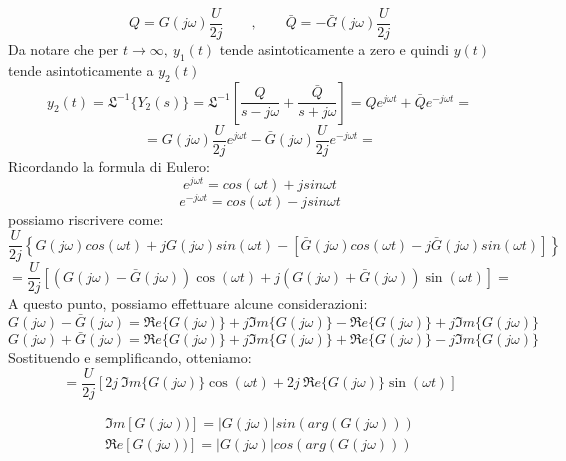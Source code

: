 \documentclass[a4paper]{report}
\begin{document}
\begin{displaymath}
  Q = G(j\omega)\dfrac{U}{2j}\qquad,\qquad
\bar{Q} = -\bar{G}(j\omega)\dfrac{U}{2j}
\end{displaymath}
Da notare che per $t \to \infty, ~y_1(t)$ tende asintoticamente a zero
e quindi $y(t)$ tende asintoticamente a $y_2(t)$
\begin{displaymath}
  y_2(t)=\mathfrak{L}^{-1}\{Y_2(s)\} = \mathfrak{L}^{-1} \left[ \dfrac{Q}{s
      - j\omega} + \dfrac{\bar{Q}}{s + j\omega} \right] = Q e^{j\omega
    t}+\bar Q e^{-j\omega t}=
\end{displaymath}
\begin{displaymath}
  = G(j\omega)\dfrac{U}{2j} e^{j\omega t} - \bar
  G(j\omega)\dfrac{U}{2j} e^{-j\omega t} =
\end{displaymath}
Ricordando la formula di Eulero\label{formulaDiEulero}:
\[
  e^{j \omega t} = cos(\omega t) + j sin{\omega t}
\]
\[
  e^{-j \omega t} = cos(\omega t) - j sin{\omega t}
\]
possiamo riscrivere come:
\[
  \dfrac{U}{2j} \left\{G(j \omega) cos(\omega t) + j G(j \omega)
  sin(\omega t) - [\bar{G}(j \omega) cos(\omega t) - j\bar{G}(j
    \omega)sin(\omega t)] \right\}
\]
\begin{displaymath}
  =\dfrac{U}{2j}\left[\left(G(j\omega)-\bar G(j\omega)\right)\cos (\omega
    t) + j\left(G(j\omega)+\bar G(j\omega)\right)\sin (\omega t)\right]=
\end{displaymath}
A questo punto, possiamo effettuare alcune considerazioni:
\[
  G(j \omega) - \bar{G}(j \omega) = \Re e\{G(j \omega)\} + j \Im m\{G(j \omega)\} -
  \Re e\{G(j \omega)\} + j \Im m\{G(j \omega)\}
\]
\[
  G(j \omega) + \bar{G}(j \omega) = \Re e\{G(j \omega)\} + j \Im m\{G(j \omega)\} +
  \Re e\{G(j \omega)\} - j \Im m\{G(j \omega)\}
\]
Sostituendo e semplificando, otteniamo:
\begin{displaymath}
  =\dfrac{U}{2j}[2j~\Im m\{ G(j\omega)\}\cos (\omega t) + 2j~\Re e
    \{G(j\omega)\}\sin(\omega t)]
\end{displaymath}

\begin{equation*}
  \begin{array}{l}
    \Im m[G(j\omega))] = |G(j\omega)| sin(arg(G(j\omega)))\\
    \Re e[G(j\omega))] = |G(j\omega)| cos(arg(G(j\omega)))
  \end{array}
\end{equation*}
\end{document}
